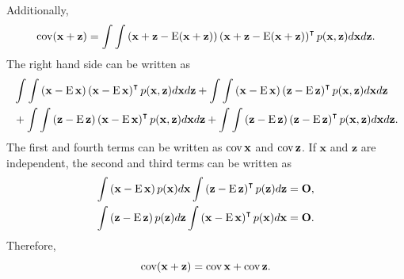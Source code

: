 Additionally,
%
\begin{equation}
\operatorname{cov} (\mathbf{x} + \mathbf{z})
= 
\int 
\int 
\left( 
	\mathbf{x} 
	+ 
	\mathbf{z} 
	- 
	\operatorname{E} (\mathbf{x} + \mathbf{z}) 
\right) 
\left( 
	\mathbf{x} 
	+ 
	\mathbf{z} 
	- 
	\operatorname{E} (\mathbf{x} + \mathbf{z}) 
\right) ^ \intercal 
p(\mathbf{x}, \mathbf{z}) 
d\mathbf{x} 
d\mathbf{z}.
\end{equation}
%
The right hand side can be written as
%
\begin{equation}
\begin{aligned}
&
\int 
\int 
\left( 
	\mathbf{x} 
	- 
	\operatorname{E} \mathbf{x} 
\right) 
\left( 
	\mathbf{x} 
	- 
	\operatorname{E} \mathbf{x} 
\right) ^ \intercal 
p(\mathbf{x}, \mathbf{z}) 
d\mathbf{x} 
d\mathbf{z}
+ 
\int 
\int 
\left( 
	\mathbf{x}
	- 
	\operatorname{E} \mathbf{x} 
\right) 
\left( 
	\mathbf{z} 
	- 
	\operatorname{E} \mathbf{z} 
\right) ^ \intercal 
p(\mathbf{x}, \mathbf{z}) 
d\mathbf{x} 
d\mathbf{z} 
\\
&+ 
\int 
\int 
\left( 
	\mathbf{z}
	- 
	\operatorname{E} \mathbf{z} 
\right) 
\left( 
	\mathbf{x} 
	- 
	\operatorname{E} \mathbf{x} 
\right) ^ \intercal 
p(\mathbf{x}, \mathbf{z}) 
d\mathbf{x} 
d\mathbf{z}
+ 
\int 
\int 
\left( 
	\mathbf{z} 
	- 
	\operatorname{E} \mathbf{z} 
\right) 
\left( 
	\mathbf{z} 
	- 
	\operatorname{E} \mathbf{z} 
\right) ^ \intercal 
p(\mathbf{x}, \mathbf{z}) 
d\mathbf{x} 
d\mathbf{z}.
\end{aligned}
\end{equation}
%
The first and fourth terms can be written as $\operatorname{cov} \mathbf{x}$ and $\operatorname{cov} \mathbf{z}$.
%
If $\mathbf{x}$ and $\mathbf{z}$ are independent, the second and third terms can be written as
%
\begin{equation}
\begin{aligned}
\int 
\left( 
	\mathbf{x} 
	- 
	\operatorname{E} \mathbf{x} 
\right) 
p(\mathbf{x}) 
d\mathbf{x}
\int 
\left( 
	\mathbf{z} 
	- 
	\operatorname{E} \mathbf{z} 
\right) ^ \intercal 
p(\mathbf{z})  
d\mathbf{z}
&= 
\mathbf{O}, 
\\
\int 
\left( 
	\mathbf{z} 
	- 
	\operatorname{E} \mathbf{z} 
\right) 
p(\mathbf{z}) 
d\mathbf{z}
\int 
\left( 
	\mathbf{x} 
	- 
	\operatorname{E} \mathbf{x} 
\right) ^ \intercal 
p(\mathbf{x})  
d\mathbf{x}
&= 
\mathbf{O}.
\end{aligned}
\end{equation}
%
Therefore,
%
\begin{equation}
\operatorname{cov} (\mathbf{x} + \mathbf{z})
= 
\operatorname{cov} \mathbf{x} 
+ 
\operatorname{cov} \mathbf{z}.
\end{equation}
%


